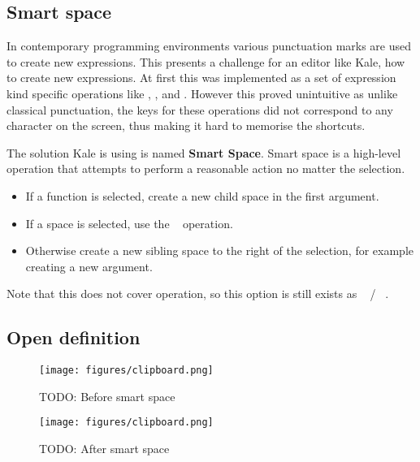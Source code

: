 \subsection{Smart space}
In contemporary programming environments various punctuation marks are used to
create new expressions. This presents a challenge for an editor like Kale, how
to create new expressions. At first this was implemented as a set of
expression kind specific operations like , , and . However this proved unintuitive as
unlike classical punctuation, the keys for these operations did not correspond
to any character on the screen, thus making it hard to memorise the shortcuts.

The solution Kale is using is named \textbf{Smart Space}. Smart space is a
high-level operation that attempts to perform a reasonable action no matter the
selection.
\begin{itemize}[noitemsep]
	\item If a function is selected, create a new child space in the first
argument.
	\item If a space is selected, use the
	\hyperref[cmd:up_down]{}~ operation.
	\item Otherwise create a new sibling space to the right of the selection, for
example creating a new argument.
\end{itemize}

Note that this does not cover  operation, so this option
is still exists as
\hyperref[cmd:new_line]{}~ /
\hyperref[cmd:new_line]{}~.

\subsection{Open definition}

\begin{figure}
	\begin{minipage}{0.5\linewidth}
	\centering
	\texttt{[image: figures/clipboard.png]}
	\caption{TODO: Before smart space}
	\end{minipage}
	\qquad
	\begin{minipage}{0.5\linewidth}
	\centering
	\texttt{[image: figures/clipboard.png]}
	\caption{TODO: After smart space}
	\end{minipage}
\end{figure}

